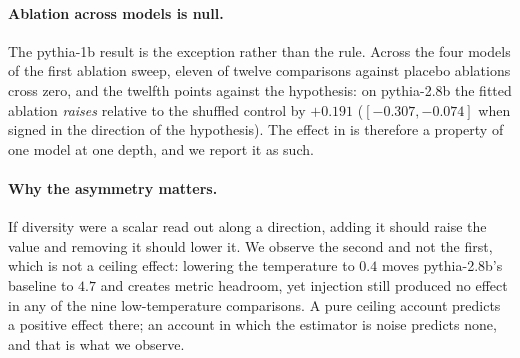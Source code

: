 \paragraph{Ablation across models is null.}
The pythia-1b result is the exception rather than the rule. Across the four models of the first
ablation sweep, eleven of twelve comparisons against placebo ablations cross zero, and the twelfth
points against the hypothesis: on pythia-2.8b the fitted ablation \emph{raises} \vendi{} relative to
the shuffled control by $+0.191$ ($[-0.307,-0.074]$ when signed in the direction of the hypothesis).
The effect in  is therefore a property of one model at one depth, and we report it
as such.

\paragraph{Why the asymmetry matters.}
If diversity were a scalar read out along a direction, adding it should raise the value and removing
it should lower it. We observe the second and not the first, which is not a ceiling effect: lowering
the temperature to $0.4$ moves pythia-2.8b's baseline to $4.7$ and creates metric headroom, yet
injection still produced no effect in any of the nine low-temperature comparisons. A pure ceiling
account predicts a positive effect there; an account in which the estimator is noise predicts none,
and that is what we observe.
